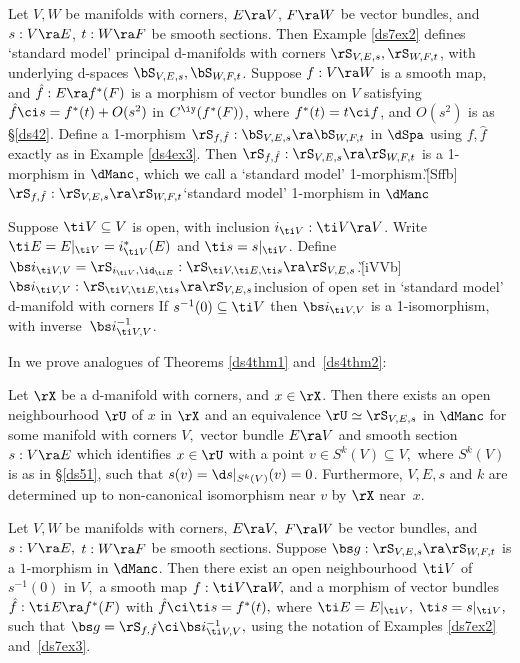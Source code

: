 \documentclass{article}
\begin{document}
\begin{ex}
Let $V,W$ be manifolds with corners, $E\ra V$, $F\ra W$ be vector
bundles, and $s:V\ra E$, $t:W\ra F$ be smooth sections. Then Example
\ref{ds7ex2} defines `standard model' principal d-manifolds with
corners $\rS_{V,E,s},\rS_{W,F,t}$, with underlying d-spaces
$\bS_{V,E,s},\bS_{W,F,t}$. Suppose $f:V\ra W$ is a smooth map, and
$\hat f:E\ra f^*(F)$ is a morphism of vector bundles on $V$
satisfying $\hat f\ci s= f^*(t)+O(s^2)$ in $C^\iy(f^*(F))$, where
$f^*(t)=t\ci f$, and $O(s^2)$ is as \S\ref{ds42}. Define a
1-morphism $\rS_{\smash{f,\hat f}}:\bS_{V,E,s}\ra\bS_{W,F,t}$ in
$\dSpa$ using $f,\hat f$ exactly as in Example \ref{ds4ex3}. Then
$\rS_{\smash{f,\hat f}}:\rS_{V,E,s}\ra\rS_{W,F,t}$ is a 1-morphism
in $\dManc$, which we call a `standard model'
1-morphism.\G[Sffb]{$\rS_{\smash{f,\hat f}}:\rS_{V,E,s}\ra
\rS_{W,F,t}$}{`standard model' 1-morphism in $\dManc$}

Suppose $\ti V\subseteq V$ is open, with inclusion $i_{\smash{\ti
V}}:\ti V\ra V$. Write $\ti E=E\vert_{\ti V}=i_{\ti V}^*(E)$ and
$\ti s=s\vert_{\ti V}$. Define $\bs i_{\smash{\ti
V,V}}=\rS_{i_{\smash{\ti V}},\id_{\ti E}}:\rS_{\smash{\ti V,\ti
E,\ti s}}\ra\rS_{V,E,s}$.\G[iVVb]{$\bs i_{\smash{\ti
V,V}}:\rS_{\smash{\ti V,\ti E,\ti s}}\ra\rS_{V,E,s}$}{inclusion of
open set in `standard model' d-manifold with corners} If
$s^{-1}(0)\subseteq\ti V$ then $\bs i_{\smash{\ti V,V}}$ is a
1-isomorphism, with inverse~$\bs i_{\ti V,V}^{-1}$.
\label{ds7ex3}
\end{ex}

In \cite[\S 7.2 \& \S 7.3]{Joyc6} we prove analogues of Theorems
\ref{ds4thm1} and~\ref{ds4thm2}:

\begin{thm} Let\/ $\rX$ be a d-manifold with corners, and\/
$x\in\rX$. Then there exists an open neighbourhood\/ $\rU$ of\/ $x$
in $\rX$ and an equivalence $\rU\simeq\rS_{V,E,s}$ in $\dManc$ for
some manifold with corners\/ $V,$ vector bundle $E\ra V$ and smooth
section $s:V\ra E$ which identifies $x\in\rU$ with a point\/ $v\in
S^k(V)\subseteq V,$ where $S^k(V)$ is as in\/ {\rm\S\ref{ds51},}
such that\/ $s(v)=\d s\vert_{S^k(V)}(v)=0$. Furthermore, $V,E,s$
and\/ $k$ are determined up to non-canonical isomorphism near $v$ by
$\rX$ near~$x$.
\label{ds7thm1}
\end{thm}

\begin{thm} Let\/ $V,W$ be manifolds with corners, $E\ra V,$ $F\ra
W$ be vector bundles, and\/ $s:V\ra E,$ $t:W\ra F$ be smooth
sections. Suppose $\bs g:\rS_{V,E,s}\ra\rS_{W,F,t}$ is a
$1$-morphism in $\dManc$. Then there exist an open neighbourhood\/
$\ti V$ of\/ $s^{-1}(0)$ in $V,$ a smooth map $f:\ti V\ra W,$ and a
morphism of vector bundles $\hat f:\ti E\ra f^*(F)$ with\/ $\hat
f\ci\ti s= f^*(t),$ where $\ti E=E\vert_{\ti V},$ $\ti s=s\vert_{\ti
V},$ such that\/ $\bs g=\rS_{\smash{f,\hat f}}\ci\smash{\bs
i_{\smash{\ti V,V}}^{-1}},$ using the notation of Examples\/
{\rm\ref{ds7ex2}} and\/~{\rm\ref{ds7ex3}}.
\label{ds7thm2}
\end{thm}
\end{document}
